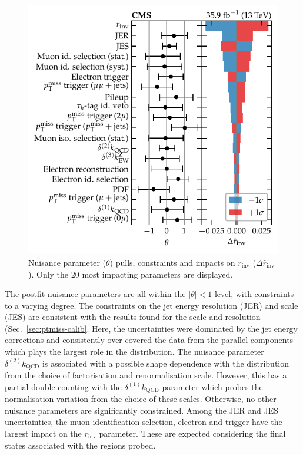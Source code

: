 \begin{figure}
    \centering
    \includegraphics{chapters/043_results/images/finalfit-impacts.pdf}
    \caption[Nuisance parameters after a fit to the data between the signal and control regions.]{
        Nuisance parameter ($\theta$) pulls, constraints and impacts on $r_{\mathrm{inv}}$ ($\Delta \hat{r}_{\mathrm{inv}}$). Only the 20 most impacting parameters are displayed.
    }
    \label{fig:finalfit-impacts}
\end{figure}
%
The postfit nuisance parameters are all within the $|\theta|<1$ level, with
constraints to a varying degree. The constraints on the jet energy resolution
(JER) and scale (JES) are consistent with the results found for the \ptmiss
scale and resolution (Sec.~\ref{sec:ptmiss-calib}. Here, the uncertainties
were dominated by the jet energy corrections and consistently over-covered the
data from the parallel components which plays the largest role in the \recoil
distribution. The nuisance parameter $\delta^{(2)}k_{\mathrm{QCD}}$ is
associated with a possible shape dependence with the \recoil distribution from
the choice of factorisation and renormalisation scale. However, this has a
partial double-counting with the $\delta^{(1)}k_{\mathrm{QCD}}$ parameter
which probes the normalisation variation from the choice of these scales.
Otherwise, no other nuisance parameters are significantly constrained. Among
the JER and JES uncertainties, the muon identification selection, electron and
\ptmiss trigger have the largest impact on the $r_{\mathrm{inv}}$ parameter.
These are expected considering the final states associated with the regions
probed.

